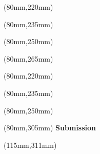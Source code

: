 \begin{titlepage}
\ifdefined\advisorTwoName
\begin{textblock*}{120mm}(80mm,220mm)
	\noindent
	\Large\textsf{\textcolor{titlecolor}{
			\textbf{\reviewerOneName} \\
			\reviewerOneTask
	}}
\end{textblock*}


\begin{textblock*}{120mm}(80mm,235mm)
	\noindent
	\Large\textsf{\textcolor{titlecolor}{
			\textbf{\advisorOneName} \\
			\advisorOneTask
	}}
\end{textblock*}

\begin{textblock*}{120mm}(80mm,250mm)
	\noindent
	\Large\textsf{\textcolor{titlecolor}{
			\textbf{\advisorTwoName} \\
			\advisorTwoTask
	}}
\end{textblock*}

\ifdefined\advisorExtName
	\begin{textblock*}{120mm}(80mm,265mm)
		\noindent
		\Large\textsf{\textcolor{titlecolor}{
			\textbf{\advisorExtName} \\
			\advisorExtTask
		}}
	\end{textblock*}
\fi	
	
\else
	\begin{textblock*}{120mm}(80mm,220mm)
		\noindent
		\Large\textsf{\textcolor{titlecolor}{
				\textbf{\reviewerOneName} \\
				\reviewerOneTask
		}}
	\end{textblock*}
	
	\begin{textblock*}{120mm}(80mm,235mm)
		\noindent
		\Large\textsf{\textcolor{titlecolor}{
				\textbf{\advisorOneName} \\
				\advisorOneTask
		}}
	\end{textblock*}
\ifdefined\advisorExtName
	\begin{textblock*}{120mm}(80mm,250mm)
		\noindent
		\Large\textsf{\textcolor{titlecolor}{
			\textbf{\advisorExtName} \\
			\advisorExtTask
		}}
	\end{textblock*}
\fi
\fi
\begin{textblock*}{60mm}(80mm,305mm)
    \noindent
    \Large\textsf{\textcolor{titlecolor}{\textbf{Submission\\}\submissionTime}}
\end{textblock*}

\begin{textblock*}{110mm}(115mm,311mm)
    \noindent
    \hfill\Large\textsf{\textcolor{titlecolor}{\textbf{\webadress}}}
\end{textblock*}

\end{titlepage}

\nopagecolor